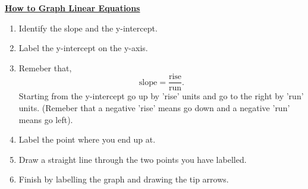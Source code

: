 \documentclass[12pt]{article} %
\begin{document}
	\renewcommand*{\coursecode}{MATH 235} %
	\renewcommand*{\assgnnumber}{Assignment 1} %
	\renewcommand*{\submdate}{September 14, 2021} %
	\renewcommand*{\studentfname}{Abdullah} %
	\renewcommand*{\studentlname}{Zubair} %
    \renewcommand*{\proofname}{Proof:}

	\renewcommand\qedsymbol{$\blacksquare$}
	\setfigpath
	\fancyhfoffset[L,O]{0pt} %




\begin{center}
		\underline{\textbf{\Huge{How to Graph Linear Equations}}}
\end{center}

	\vspace*{0.5cm}
\begin{enumerate}
			\item Identify the slope and the y-intercept.
			\item Label the y-intercept on the y-axis.
			\item Remeber that, \[
								\text{slope} = \frac{\text{rise}}{\text{run}}
			.\] Starting from the y-intercept go up by 'rise' units and go to the right by 'run' units. (Remeber that a negative 'rise' means go down and a
			negative 'run' means go left).
			\item Label the point where you end up at.
			\item Draw a straight line through the two points you have labelled.
			\item Finish by labelling the graph and drawing the tip arrows.
\end{enumerate}
\end{document}
